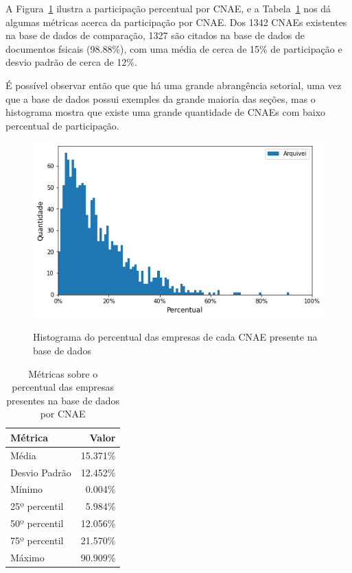 A Figura~\ref{fig:base-de-dados:descritiva-9.1-presenca-por-cnae} ilustra a participação percentual por CNAE, e a Tabela~\ref{tab:participacao-por-cnae} nos dá algumas métricas acerca da participação por CNAE. Dos 1342 CNAEs existentes na base de dados de comparação, 1327 são citados na base de dados de documentos fsicais (98.88\%), com uma média de cerca de 15\% de participação e desvio padrão de cerca de 12\%.

É possível observar então que que há uma grande abrangência setorial, uma vez que a base de dados possui exemples da grande maioria das seções, mas o histograma mostra que existe uma grande quantidade de CNAEs com baixo percentual de participação.

\begin{figure}[htb]
	\centering
    \caption{Histograma do percentual das empresas de cada CNAE presente na base de dados}
    \includegraphics[scale=0.7]{images/base-de-dados-9.1-presenca-por-cnae.png}
    \label{fig:base-de-dados:descritiva-9.1-presenca-por-cnae}
    \fdadospesquisa
\end{figure}

\begin{table}[htb]
\centering
\caption{Métricas sobre o percentual das empresas presentes na base de dados por  CNAE}
\label{tab:participacao-por-cnae}
\begin{tabular}{lr}
\toprule
Métrica & Valor \\
\midrule
Média         &   15.371\% \\
Desvio Padrão &   12.452\% \\
Mínimo        &    0.004\% \\
25º percentil &    5.984\% \\
50º percentil &   12.056\% \\
75º percentil &   21.570\% \\
Máximo        &   90.909\% \\
\bottomrule
\end{tabular}
\fdadospesquisa
\end{table}

